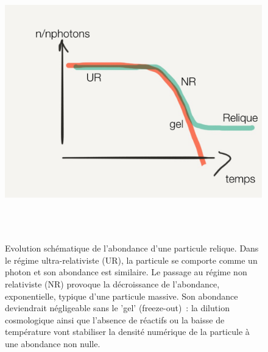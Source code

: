 \begin{figure}[htbp]
	\centering
		\includegraphics[height=12cm]{figs/freeze.png}
	\caption[Evolution schématique de l'abondance d'une particule relique.]{Evolution schématique de l'abondance d'une particule relique. Dans le régime ultra-relativiste (UR), la particule se comporte comme un photon et son abondance est similaire. Le passage au régime non relativiste (NR) provoque la décroissance de l'abondance, exponentielle, typique d'une particule massive. Son abondance deviendrait négligeable sans le 'gel' (freeze-out)~: la dilution cosmologique ainsi que l'absence de réactifs ou la baisse de température vont stabiliser la densité numérique de la particule à une abondance non nulle. }
	\label{f:freeze}
\end{figure}
 
